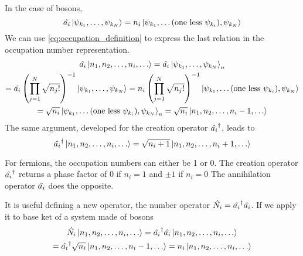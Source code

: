 In the case of bosons,
\begin{equation}
    \hat{a_i} \ket{\psi_{k_1}, \dots, \psi_{k_N}} = n_i \ket{\psi_{k_1}, \dots (\text{one less }\psi_{k_i}), \psi_{k_N}}
\end{equation}
We can use \cref{eq:occupation_definition} to express the last relation in the occupation number representation.
\begin{multline}
    \hat{a_i} \ket{n_1, n_2, \dots, n_i, \dots} =
    \hat{a_i} \ket{\psi_{k_1}, \dots, \psi_{k_N}}_n
    \\ = \hat{a_i} \left( \prod_{j=1}^N \sqrt{n_j!} \right)^{-1} \ket{\psi_{k_1}, \dots, \psi_{k_N}}
    = n_i \left( \prod_{j=1}^N \sqrt{n_j!} \right)^{-1} \ket{\psi_{k_1}, \dots (\text{one less }\psi_{k_i}), \psi_{k_N}}
    \\ = \sqrt{n_i} \ket{\psi_{k_1}, \dots (\text{one less }\psi_{k_i}), \psi_{k_N}}_n = \sqrt{n_i} \ket{n_1, n_2, \dots, n_i-1, \dots}
\end{multline}
The same argument, developed for the creation operator $\hat{a_i}^\dagger$, leads to
\begin{equation}
    \hat{a_i}^\dagger \ket{n_1, n_2, \dots, n_i, \dots} = \sqrt{n_i+1} \ket{n_1, n_2, \dots, n_i+1, \dots}
\end{equation}


For fermions, the occupation numbers can either be 1 or 0. The creation operator $\hat{a_i}^\dagger$ returns a phase factor of 0 if $n_i=1$ and $\pm 1$ if $n_i=0$ The annihilation operator $\hat{a_i}$ does the opposite.

It is useful defining a new operator, the number operator $\hat{N_i} = \hat{a_i}^\dagger\hat{a_i}$. If we apply it to base ket of a system made of bosons
\begin{multline} \label{eq:number_operator}
    \hat{N_i} \ket{n_1, n_2, \dots, n_i, \dots}
    = \hat{a_i}^\dagger\hat{a_i} \ket{n_1, n_2, \dots, n_i, \dots}
    \\ = \hat{a_i}^\dagger \sqrt{n_i} \ket{n_1, n_2, \dots, n_i-1, \dots}
    = n_i \ket{n_1, n_2, \dots, n_i, \dots}
\end{multline}

